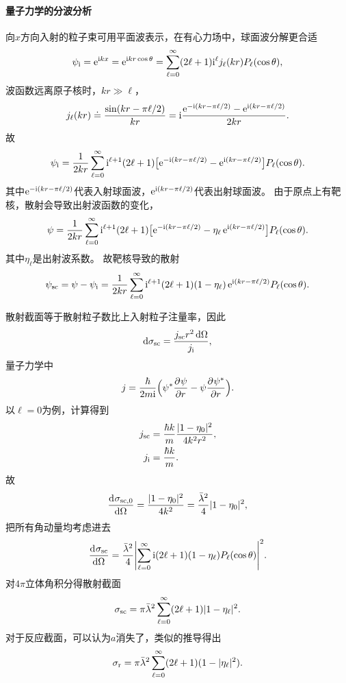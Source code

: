 \paragraph{量子力学的分波分析}
向$x$方向入射的粒子束可用平面波表示，在有心力场中，球面波分解更合适
\begin{equation}\label{eq:nrd-incident-plane-wave}
	\psi_\mathrm i = \mathop{}\!\mathrm{e}^{\mathrm{i} kx} = \mathop{}\!\mathrm{e}^{\mathrm{i} kr\cos\theta} = \sum_{\ell=0}^\infty(2\ell + 1)\mathrm{i}^\ell j_\ell(kr)P_\ell(\cos\theta),
\end{equation}
波函数远离原子核时，$kr \gg \ell$，
\[
	j_\ell(kr) \doteq \frac{\sin(kr - \pi\ell/2)}{kr} = \mathrm{i}\frac{\mathop{}\!\mathrm{e}^{-\mathrm{i}(kr-\pi\ell/2)} - \mathop{}\!\mathrm{e}^{\mathrm{i}(kr-\pi\ell/2)}}{2kr}.
\]
故
\[
	\psi_\mathrm i = \frac1{2kr}\sum_{\ell=0}^\infty\mathrm{i}^{\ell+1}(2\ell + 1)\bigl[\mathop{}\!\mathrm{e}^{-\mathrm{i}(kr-\pi\ell/2)} - \mathop{}\!\mathrm{e}^{\mathrm{i}(kr-\pi\ell/2)}\bigr]P_\ell(\cos\theta).
\]
其中$\mathop{}\!\mathrm{e}^{-\mathrm{i}(kr-\pi\ell/2)}$代表入射球面波，$\mathop{}\!\mathrm{e}^{\mathrm{i}(kr-\pi\ell/2)}$代表出射球面波。
由于原点上有靶核，散射会导致出射波函数的变化，
\[
	\psi = \frac1{2kr}\sum_{\ell=0}^\infty\mathrm{i}^{\ell+1}(2\ell + 1)\bigl[\mathop{}\!\mathrm{e}^{-\mathrm{i}(kr-\pi\ell/2)} - \eta_\ell\mathop{}\!\mathrm{e}^{\mathrm{i}(kr-\pi\ell/2)}\bigr]P_\ell(\cos\theta).
\]
其中$\eta_\ell$是出射波系数。
故靶核导致的散射
\begin{align}
	\psi_{\mathrm{sc}} = \psi - \psi_\mathrm i = \frac1{2kr}\sum_{\ell=0}^\infty\mathrm{i}^{\ell+1}(2\ell + 1)(1 - \eta_\ell)\mathop{}\!\mathrm{e}^{\mathrm{i}(kr-\pi\ell/2)}P_\ell(\cos\theta).
\end{align}

散射截面等于散射粒子数比上入射粒子注量率，因此
\begin{equation}\label{eq:nrd-flux-cross-section}
	\mathop{}\!\mathrm{d}\sigma_{\mathrm{sc}} = \frac{j_{\mathrm{sc}} r^2\mathop{}\!\mathrm{d}\Omega}{j_\mathrm i},
\end{equation}
量子力学中
\begin{equation}\label{eq:nrd-radial-probability-current}
	j = \frac{\hbar}{2m\mathrm{i}}\Bigl(\psi^\ast\frac{\partial^{}\psi}{\partial{r}^{}} - \psi\frac{\partial^{}\psi^\ast}{\partial{r}^{}}\Bigr).
\end{equation}
以$\ell = 0$为例，计算得到
\begin{align*}
	j_{\mathrm{sc}} &= \frac{\hbar k}m\frac{\lvert1 - \eta_0\rvert^2}{4k^2r^2},\\
	j_\mathrm i &= \frac{\hbar k}m.
\end{align*}
故
\[
	\frac{\mathop{}\!\mathrm{d}^{}\sigma_{\mathrm{sc},0}}{\mathrm{d}{\Omega}^{}} = \frac{\lvert1 - \eta_0\rvert^2}{4k^2} = \frac{\bar{\lambda}^2}4\lvert1 - \eta_0\rvert^2,
\]
把所有角动量均考虑进去
\begin{equation}\label{eq:nrd-elastic-angular-cross-section}
	\frac{\mathop{}\!\mathrm{d}^{}\sigma_{\mathrm{sc}}}{\mathrm{d}{\Omega}^{}} = \frac{\bar{\lambda}^2}4\Biggl\lvert\sum_{\ell=0}^\infty\mathrm{i}(2\ell + 1)(1 - \eta_\ell)P_\ell(\cos\theta)\Biggr\rvert^2.
\end{equation}
对$4\pi$立体角积分得散射截面
\begin{align}
	\sigma_{\mathrm{sc}} = \pi\bar{\lambda}^2\sum_{\ell=0}^\infty(2\ell + 1)\lvert1 - \eta_\ell\rvert^2.
\end{align}
对于反应截面，可以认为$a$消失了，类似的推导得出
\begin{equation}\label{eq:nrd-partial-wave-reaction-cross-section}
	\sigma_\mathrm r = \pi\bar{\lambda}^2\sum_{\ell=0}^\infty(2\ell + 1)(1 - \lvert\eta_\ell\rvert^2).
\end{equation}

